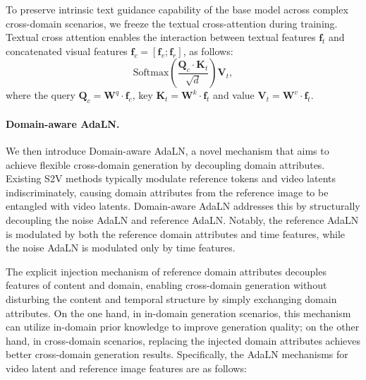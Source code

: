 To preserve intrinsic text guidance capability of the base model across complex cross-domain scenarios, we freeze the textual cross-attention during training. Textual cross attention enables the interaction between textual features $\boldsymbol{f}_t$  and concatenated visual features $\boldsymbol{f}_c = [\boldsymbol{f}_v; \boldsymbol{f}_r]$, as follows:
\begin{equation}
\label{eq:attention2}
 \text{Softmax}\left( \frac{   \boldsymbol{Q}_{c} \cdot \boldsymbol{K}_{t}}{\sqrt{d}} \right)  \boldsymbol{V}_{t}, 
\end{equation}
where the query $\boldsymbol{Q}_c=\boldsymbol{W}^q\cdot \boldsymbol{f}_c$,  key  $\boldsymbol{K}_t=\boldsymbol{W}^k \cdot \boldsymbol{f}_t$ and value $\boldsymbol{V}_t=\boldsymbol{W}^v \cdot \boldsymbol{f}_t$. 


\paragraph{\textbf{Domain-aware AdaLN.}} We then introduce Domain-aware AdaLN, a novel mechanism that aims to achieve flexible cross-domain generation by decoupling domain attributes. Existing S2V methods typically modulate reference tokens and video latents indiscriminately, causing domain attributes from the reference image to be entangled with video latents. Domain-aware AdaLN addresses this by structurally decoupling the noise AdaLN and reference AdaLN. Notably, the reference AdaLN is modulated by both the reference domain attributes and time features, while the noise AdaLN is modulated only by time features.

The explicit injection mechanism of reference domain attributes decouples features of content and domain, enabling cross-domain generation without disturbing the content and temporal structure by simply exchanging domain attributes. On the one hand, in in-domain generation scenarios, this mechanism can utilize in-domain prior knowledge to improve generation quality; on the other hand, in cross-domain scenarios, replacing the injected domain attributes achieves better cross-domain generation results. Specifically, the AdaLN mechanisms for video latent and reference image features are as follows:


